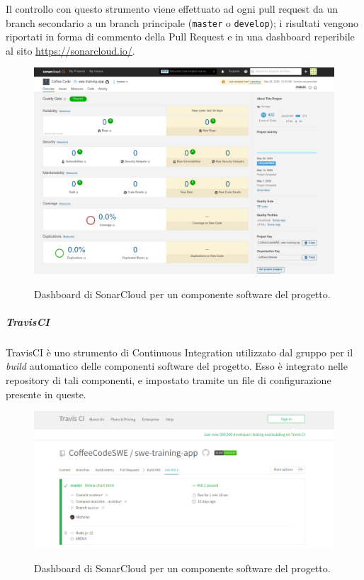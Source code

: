 \documentclass[../norme-di-progetto.tex]{subfiles}
\begin{document}
Il controllo con questo strumento viene effettuato ad ogni pull request da un branch secondario a un branch principale (\texttt{master} o \texttt{develop}); i risultati vengono riportati in forma di commento della Pull Request e in una dashboard reperibile al sito \href{https://sonarcloud.io/}{https://sonarcloud.io/}.

\begin{figure}[H]
  \centering
  \includegraphics[width=15cm]{img/sonarcloud.png}
  \label{fig:github}
  \caption{Dashboard di SonarCloud per un componente software del progetto.}
\end{figure}

\subparagraph{TravisCI}
TravisCI è uno strumento di Continuous Integration utilizzato dal gruppo per il \textit{build} automatico delle componenti software del progetto. Esso è integrato nelle repository di tali componenti, e impostato tramite un file di configurazione presente in queste. \\

\begin{figure}[H]
  \centering
  \includegraphics[width=15cm]{img/travis.png}
  \label{fig:github}
  \caption{Dashboard di SonarCloud per un componente software del progetto.}
\end{figure}
\end{document}
